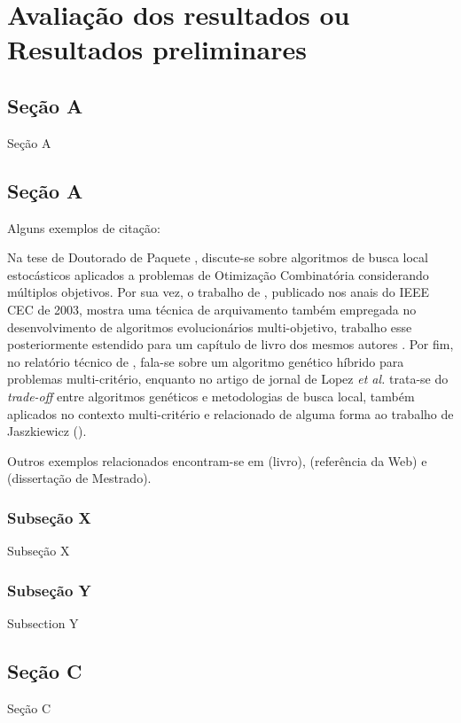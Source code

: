 \chapter{Avaliação dos resultados ou \\ Resultados preliminares}
\label{cap:capitulo5}


\section{Seção A}

Seção A


\section{Seção A}

Alguns exemplos de citação: 

Na tese de Doutorado de Paquete \cite{PaquetePhD}, discute-se sobre algoritmos de busca local estocásticos aplicados a problemas de Otimização Combinatória considerando múltiplos objetivos. Por sua vez, o trabalho de \cite{KnowlesBoundedLebesgue}, publicado nos anais do IEEE CEC de 2003, mostra uma técnica de arquivamento também empregada no desenvolvimento de algoritmos evolucionários multi-objetivo, trabalho esse posteriormente estendido para um capítulo de livro dos mesmos autores \cite{KnowlesBoundedPareto}. Por fim, no relatório técnico de , fala-se sobre um algoritmo genético híbrido para problemas multi-critério, enquanto no artigo de jornal de Lopez \textit{et al.} \cite{LopezPaqueteStu} trata-se do \textit{trade-off} entre algoritmos genéticos e metodologias de busca local, também aplicados no contexto multi-critério e relacionado de alguma forma ao trabalho de Jaszkiewicz (\citeyear{Jaszkiewicz}).

Outros exemplos relacionados encontram-se em \cite{Silberschatz} (livro), \cite{DB2XML} (referência da Web) e \cite{Angelo} (dissertação de Mestrado).

\subsection{Subseção X}

Subseção X


\subsection{Subseção Y}

Subsection Y


\section{Seção C}

Seção C